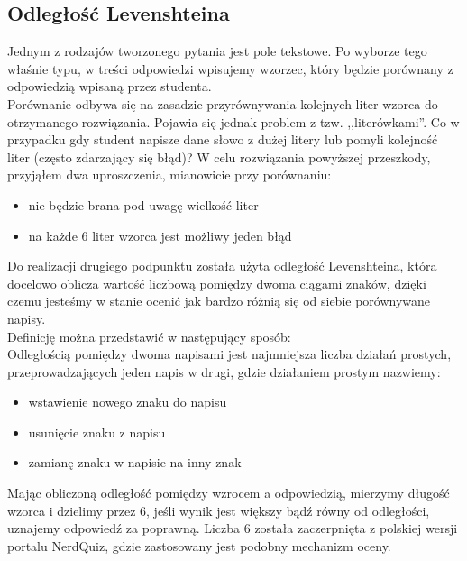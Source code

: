 \documentclass[a4paper,12pt]{article}
\begin{document}
\subsection{Odległość Levenshteina}\label{sec:levenshtein}
Jednym z rodzajów tworzonego pytania jest pole tekstowe. Po wyborze tego właśnie typu, w
treści odpowiedzi wpisujemy wzorzec, który będzie porównany z odpowiedzią wpisaną przez
studenta.\\
Porównanie odbywa się na zasadzie przyrównywania kolejnych liter wzorca do otrzymanego
rozwiązania. Pojawia się jednak problem z tzw. ,,literówkami''. Co w przypadku gdy student
napisze dane słowo z dużej litery lub pomyli kolejność liter (często zdarzający się błąd)?
W celu rozwiązania powyższej przeszkody, przyjąłem dwa uproszczenia, mianowicie przy
porównaniu:
\begin{itemize}
  \item nie będzie brana pod uwagę wielkość liter
  \item na każde 6 liter wzorca jest możliwy jeden błąd
\end{itemize}
Do realizacji drugiego podpunktu została użyta odległość Levenshteina, która docelowo
oblicza wartość liczbową pomiędzy dwoma ciągami znaków, dzięki czemu jesteśmy w stanie
ocenić jak bardzo różnią się od siebie porównywane napisy.\\
Definicję można przedstawić w następujący sposób: \cite{levenshtein}\\
Odległością pomiędzy dwoma napisami jest najmniejsza liczba działań prostych,
przeprowadzających jeden napis w drugi, gdzie działaniem prostym nazwiemy:
\begin{itemize}
  \item wstawienie nowego znaku do napisu
  \item usunięcie znaku z napisu
  \item zamianę znaku w napisie na inny znak
\end{itemize}
Mając obliczoną odległość pomiędzy wzrocem a odpowiedzią, mierzymy długość wzorca i
dzielimy przez 6, jeśli wynik jest większy bądź równy od odległości, uznajemy odpowiedź
za poprawną. Liczba 6 została zaczerpnięta z polskiej wersji portalu NerdQuiz, gdzie
zastosowany jest podobny mechanizm oceny.

\clearpage


\end{document}
